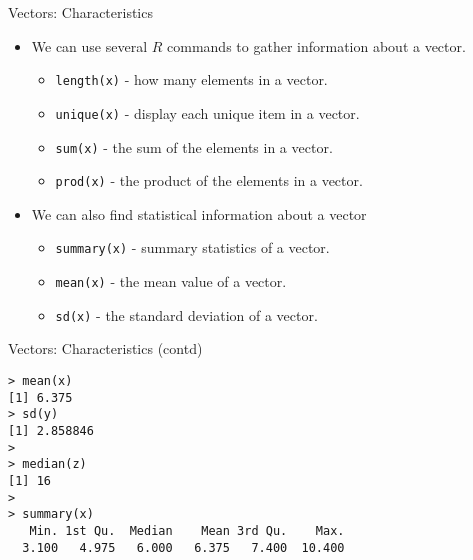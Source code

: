 \documentclass{beamer}
\begin{document}
\begin{frame}[fragile]{Vectors: Characteristics}

\begin{itemize}
\item We can use several $R$ commands to gather information about
a vector.

\begin{itemize}
\item \texttt{length(x)} - how many elements in a vector.  
\item \texttt{unique(x)} - display each unique item in a vector.  
\item \texttt{sum(x)} - the sum of the elements in a vector. 
\item \texttt{prod(x)} - the product of the elements in a vector.
\end{itemize}

\item We can also find statistical information about a vector
\begin{itemize}
\item \texttt{summary(x)} - summary statistics of a vector.  \item \texttt{mean(x)} -
the mean value of a vector. \item \texttt{sd(x)} -  the standard deviation
of a vector.
\end{itemize}

\end{itemize}
\end{frame}
\begin{frame}[fragile]{Vectors: Characteristics (contd)}



\begin{framed}
\begin{verbatim}
> mean(x)
[1] 6.375
> sd(y)
[1] 2.858846
>
> median(z)
[1] 16
>
> summary(x)
   Min. 1st Qu.  Median    Mean 3rd Qu.    Max.
  3.100   4.975   6.000   6.375   7.400  10.400
\end{verbatim}
\end{framed}
\end{frame}
\end{document}
